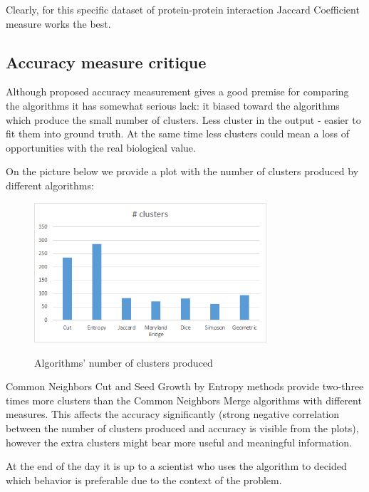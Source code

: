 \documentclass[journal]{IEEEtran}
\begin{document}
Clearly, for this specific dataset of protein-protein interaction Jaccard Coefficient measure works the best.

\subsection{Accuracy measure critique}
Although proposed accuracy measurement gives a good premise for comparing the algorithms it has somewhat serious lack: it biased toward the algorithms which produce the small number of clusters. Less cluster in the output - easier to fit them into ground truth. At the same time less clusters could mean a loss of opportunities with the real biological value. 

On the picture below we provide a plot with the number of clusters produced by different algorithms:
\begin{figure}[h!]
	\includegraphics[width=3.4in,clip,keepaspectratio]{num-clusters}\
	\caption{Algorithms' number of clusters produced}	
\end{figure}
Common Neighbors Cut and Seed Growth by Entropy methods provide two-three times more clusters than the Common Neighbors Merge algorithms with different measures. This affects the accuracy significantly (strong negative correlation between the number of clusters produced and accuracy is visible from the plots), however the extra clusters might bear more useful and meaningful information. 

At the end of the day it is up to a scientist who uses the algorithm to decided which behavior is preferable due to the context of the problem.
\end{document}
